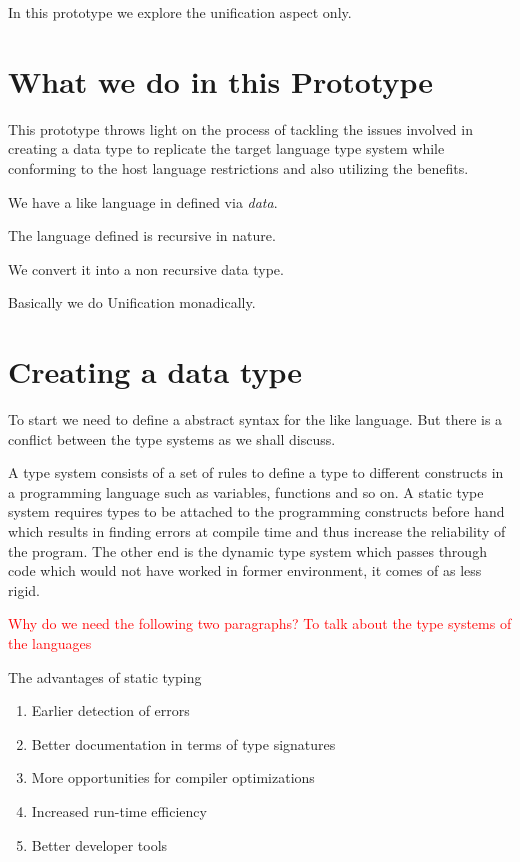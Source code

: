 \documentclass[thesis-solanki.tex]{subfiles}
\begin{document}
In this prototype we explore the unification aspect only.

\section{What we do in this Prototype}
This prototype throws light on the process of tackling the issues involved in creating
a data type to replicate the target language type system while conforming to the host language restrictions and also utilizing the
benefits.


We have a  like language in  defined via \textit{data}.

The language defined is recursive in nature.

We convert it into a non recursive data type.


Basically we do Unification monadically.


\section{Creating a data type}

To start we need to define a abstract syntax for the  like language. But there is a conflict between the type systems as
we shall discuss.


A type system consists of a set of rules to define a type to different constructs in a programming language such as variables, functions
and so on. A static type system requires types to be attached to the programming constructs before hand which results in finding errors at
compile time and thus increase the reliability of the program. The other end is the dynamic type system which passes through code which
would not have worked in former environment, it comes of as less rigid.

\textcolor{red}{Why do we need the following two paragraphs? To talk about the type systems of the languages}

The advantages of static typing \cite{meijer2004static}
\begin{enumerate}
\item Earlier detection of errors
\item Better documentation in terms of type signatures
\item More opportunities for compiler optimizations
\item Increased run-time efficiency
\item Better developer tools
\end{enumerate}
\end{document}
